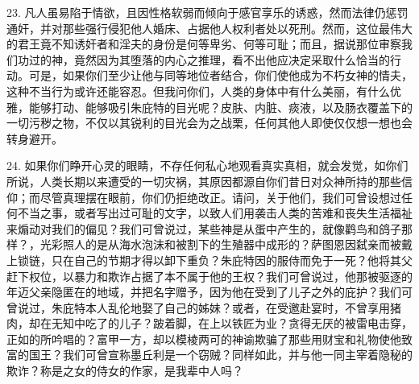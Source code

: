 23. 凡人虽易陷于情欲，且因性格软弱而倾向于感官享乐的诱惑，然而法律仍惩罚通奸，并对那些强行侵犯他人婚床、占据他人权利者处以死刑。然而，这位最伟大的君王竟不知诱奸者和淫夫的身份是何等卑劣、何等可耻；而且，据说那位审察我们功过的神，竟然因为其堕落的内心之推理，看不出他应决定采取什么恰当的行动。可是，如果你们至少让他与同等地位者结合，你们使他成为不朽女神的情夫，这种不当行为或许还能容忍。但我问你们，人类的身体中有什么美丽，有什么优雅，能够打动、能够吸引朱庇特的目光呢？皮肤、内脏、痰液，以及肠衣覆盖下的一切污秽之物，不仅以其锐利的目光会为之战栗，任何其他人即使仅仅想一想也会转身避开。\par

24. 如果你们睁开心灵的眼睛，不存任何私心地观看真实真相，就会发觉，如你们所说，人类长期以来遭受的一切灾祸，其原因都源自你们昔日对众神所持的那些信仰；而尽管真理摆在眼前，你们仍拒绝改正。请问，关于他们，我们可曾设想过任何不当之事，或者写出过可耻的文字，以致人们用袭击人类的苦难和丧失生活福祉来煽动对我们的偏见？我们可曾说过，某些神是从蛋中产生的，就像鹳鸟和鸽子那样？，光彩照人的是从海水泡沫和被割下的生殖器中成形的？萨图恩因弑亲而被戴上锁链，只在自己的节期才得以卸下重负？朱庇特因的服侍而免于一死？他将其父赶下权位，以暴力和欺诈占据了本不属于他的王权？我们可曾说过，他那被驱逐的年迈父亲隐匿在的地域，并把名字赠予，因为他在受到了儿子之外的庇护？我们可曾说过，朱庇特本人乱伦地娶了自己的姊妹？或者，在受邀赴宴时，不曾享用猪肉，却在无知中吃了的儿子？跛着脚，在上以铁匠为业？贪得无厌的被雷电击穿，正如的所吟唱的？富甲一方，却以模棱两可的神谕欺骗了那些用财宝和礼物使他致富的国王？我们可曾宣称墨丘利是一个窃贼？同样如此，并与他一同主宰着隐秘的欺诈？称是之女的侍女的作家，是我辈中人吗？\par

